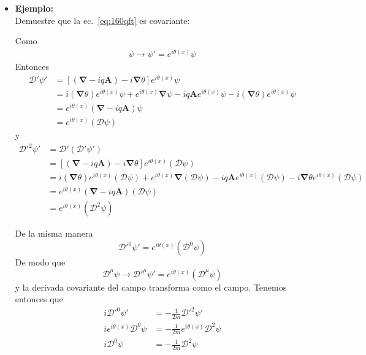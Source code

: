 \begin{itemize}
\item \textbf{Ejemplo:}\\ 
Demuestre que la ec.~\eqref{eq:160qft} es covariante:



Como 
\begin{align}
  \psi\to \psi'=e^{i\theta(x)}\psi
\end{align}
Entonces
\begin{align}
  \boldsymbol{\mathcal{D}}'\psi'&=\left[(\boldsymbol{\nabla}-iq\mathbf{A})-i\boldsymbol{\nabla}\theta\right]e^{i\theta(x)}\psi\nonumber\\
  &=i(\boldsymbol{\nabla}\theta)e^{i\theta(x)}\psi+e^{i\theta(x)}\boldsymbol{\nabla}\psi-iq\mathbf{A}e^{i\theta(x)}\psi-i(\boldsymbol{\nabla}\theta) e^{i\theta(x)}\psi\nonumber\\
  &=e^{i\theta(x)}(\boldsymbol{\nabla}-iq\mathbf{A})\psi\nonumber\\
  &=e^{i\theta(x)}(\boldsymbol{\mathcal{D}}\psi)
\end{align}
y
\begin{align}
  {\boldsymbol{\mathcal{D}}'}^2\psi'&=\boldsymbol{\mathcal{D}}'(\boldsymbol{\mathcal{D}}'\psi')\nonumber\\
  &=\left[(\boldsymbol{\nabla}-iq\mathbf{A})-i\boldsymbol{\nabla}\theta\right]e^{i\theta(x)}(\boldsymbol{\mathcal{D}}\psi)\nonumber\\
  &=i(\boldsymbol{\nabla}\theta)e^{i\theta(x)}(\boldsymbol{\mathcal{D}}\psi)+e^{i\theta(x)}\boldsymbol{\nabla}(\boldsymbol{\mathcal{D}}\psi)
  -iq\mathbf{A}e^{i\theta(x)}(\boldsymbol{\mathcal{D}}\psi)-i\boldsymbol{\nabla}\theta e^{i\theta(x)}(\boldsymbol{\mathcal{D}}\psi)\nonumber\\
  &=e^{i\theta(x)}(\boldsymbol{\nabla}-iq\mathbf{A})(\boldsymbol{\mathcal{D}}\psi)\nonumber\\
  &=e^{i\theta(x)}(\boldsymbol{\mathcal{D}}^2\psi)
\end{align}

De la misma manera
\begin{equation}
  {\mathcal{D}'}^0\psi'=e^{i\theta(x)}(\mathcal{D}^0\psi)
\end{equation}
De modo que
\begin{equation}
  \mathcal{D}^\mu\psi\to {\mathcal{D}'}^\mu\psi'=e^{i\theta(x)}(\mathcal{D}^\mu\psi)
\end{equation}
y la derivada covariante del campo transforma como el campo. Tenemos entonces que 
\begin{align}
  \label{eq:225qft}
     i{\mathcal{D}'}^0\psi'&=-\frac{1}{2m}{\boldsymbol{\mathcal{D}}'}^2\psi'\nonumber\\
     ie^{i\theta(x)}{\mathcal{D}}^0\psi&=-\frac{1}{2m}e^{i\theta(x)}{\boldsymbol{\mathcal{D}}}^2\psi\nonumber\\
     i{\mathcal{D}}^0\psi&=-\frac{1}{2m}{\boldsymbol{\mathcal{D}}}^2\psi
\end{align}
\end{itemize}

